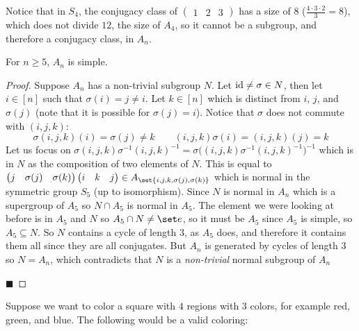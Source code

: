 \documentclass[10pt]{article}
\def\pmat#1{\begin{pmatrix} #1 \end{pmatrix}}
\begin{document}
Notice that in $S_4$, the conjugacy class of $\pmat{1&2&3}$ has a size of $8$ ($\frac{4\cdot3\cdot2}3=8$), which does not divide $12$, the size of $A_4$, so it cannot be a subgroup, and therefore a conjugacy
class, in $A_n$.

\begin{thrm*}

    For $n\geq5$, $A_n$ is simple.

\end{thrm*}

\begin{proof}

    Suppose $A_n$ has a non-trivial subgroup $N$.
    Let ${\rm id}\neq\sigma\in N$, then let $i\in[n]$ such that $\sigma(i)=j\neq i$.
    Let $k\in[n]$ which is distinct from $i$, $j$, and $\sigma(j)$ (note that it is possible for $\sigma(j)=i$).
    Notice that $\sigma$ does not commute with $(i,j,k)$:
    \[ \sigma(i,j,k)(i)=\sigma(j)\neq k\qquad (i,j,k)\sigma(i)=(i,j,k)(j)=k \]
    Let us focus on $\sigma(i,j,k)\sigma^{-1}(i,j,k)^{-1}=\sigma\bigl((i,j,k)\sigma^{-1}(i,j,k)^{-1}\bigr)^{-1}$ which is in $N$ as the composition of two elements of $N$.
    This is equal to $\pmat{j & \sigma(j) & \sigma(k)}\pmat{i&k&j}\in A_{\set{i,j,k,\sigma(j),\sigma(k)}}$ which is normal in the symmetric group $S_5$ (up to isomorphism).
    Since $N$ is normal in $A_n$ which is a supergroup of $A_5$ so $N\cap A_5$ is normal in $A_5$.
    The element we were looking at before is in $A_5$ and $N$ so $A_5\cap N\neq\set e$, so it must be $A_5$ since $A_5$ is simple, so $A_5\subseteq N$.
    So $N$ contains a cycle of length $3$, as $A_5$ does, and therefore it contains them all since they are all conjugates.
    But $A_n$ is generated by cycles of length $3$ so $N=A_n$, which contradicts that $N$ is a \emph{non-trivial} normal subgroup of $A_n$ \lightning

    \hfill$\blacksquare$

\end{proof}

Suppose we want to color a square with $4$ regions with $3$ colors, for example red, green, and blue.
The following would be a valid coloring:

\begin{center}
\end{center}
\end{document}
